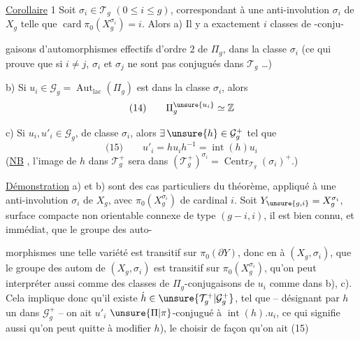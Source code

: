 \uline{Corollaire} 1 Soit $\sigma_i\in\mathcal{T}_g$ $(0\leq i\leq g)$,
correspondant à une anti-involution $\sigma_i$ de
$X_g$ telle que $\operatorname{card}\pi_0(X_g^{\sigma_i})=i$. Alors
a) Il y a exactement $i$ classes de -conju-

gaisons d'automorphismes effectifs d'ordre $2$
de $\Pi_g$, dans la classe $\sigma_i$ (ce qui prouve
que si $i\neq j$, $\sigma_i$ et $\sigma_j$ ne sont pas
conjugués dans $\mathcal{T}_g$  \dots)

b) Si $u_i\in\mathcal{G}_g=\operatorname{Aut}_{\mathrm{lac}}(\Pi_g)$ est  dans la
classe $\sigma_i$, alors 
\[
\text{(14)}\qquad \Pi_g^{\unsure{u_i}}\simeq\mathbb{Z}
\]

c) Si $u_i,u'_i\in\mathcal{G}_g$, 
 de classe $\sigma_i$, alors $\exists\,\unsure{h}\in\mathcal{G}_g^+$
tel que
\[
\text{(15)}\qquad u'_i=hu_ih^{-1}=\operatorname{int}(h)u_i
\]
(\uline{NB} , l'image de $h$ dans $\mathcal{T}_g^+$
sera dans $(\mathcal{T}_g^+)^{\sigma_i}=\operatorname{Centr}_{\mathcal{T}_g}(\sigma_i)^+$.)

\uline{Démonstration} a) et b) sont des cas
particuliers du théorème, appliqué à
une anti-involution $\sigma_i$ de $X_g$, avec
$\pi_0(X_g^{\sigma_i})$ de cardinal $i$. Soit $Y_{\unsure{g,i}}=X_g^{\sigma_i}$,
surface compacte  non orientable  connexe
de type $(g-i,i)$, il est bien connu,
et immédiat, que le groupe des auto-

morphismes  une telle variété est transitif
sur $\pi_0(\partial Y)$, donc en  à $(X_g,\sigma_i)$, que
le groupe des autom de $(X_g,\sigma_i)$ est transitif
sur $\pi_0(X_g^{\sigma_i})$,  qu'on peut interpréter
aussi comme  des classes de $\Pi_g$-conjugaisons
de $u_i$ comme dans b), c). Cela
implique donc qu'il existe $\dot{h}\in\unsure{\mathcal{T}_g^+|\mathcal{G}_g^+}$,  tel que
-- désignant par $h$ un  dans $\mathcal{G}_g^+$ --
on ait $u'_i$ $\unsure{\Pi|\pi}$-conjugué à $\operatorname{int}(h).u_i$, ce
qui signifie aussi qu'on peut quitte à modifier
$h$), le choisir de façon qu'on ait (15)

